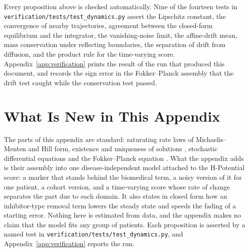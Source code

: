Every proposition above is checked automatically. Nine of the fourteen tests in
\texttt{verification/tests/test\_dynamics.py} assert the Lipschitz constant, the
convergence of nearby trajectories, agreement between the closed-form
equilibrium and the integrator, the vanishing-noise limit, the affine-drift
mean, mass conservation under reflecting boundaries, the separation of drift
from diffusion, and the product rule for the time-varying score.
Appendix~\ref{app:verification} prints the result of the run that produced this
document, and records the sign error in the Fokker--Planck assembly that the
drift test caught while the conservation test passed.


\section*{What Is New in This Appendix}

The parts of this appendix are standard: saturating rate laws of
Michaelis--Menten and Hill form, existence and uniqueness of solutions
\citep{coddington_levinson_1955,gronwall_1919}, stochastic differential
equations \citep{oksendal_2003} and the Fokker--Planck equation
\citep{risken_1996}. What the appendix adds is their assembly into one
disease-independent model attached to the H-Potential score: a marker that
stands behind the biomedical term, a noisy version of it for one patient, a
cohort version, and a time-varying score whose rate of change separates the
part due to each domain. It also states in closed form how an inhibitor-type
removal term lowers the steady state and speeds the fading of a starting error.
Nothing here is estimated from data, and the appendix makes no claim that the
model fits any group of patients. Each proposition is asserted by a named test
in \texttt{verification/tests/test\_dynamics.py}, and
Appendix~\ref{app:verification} reports the run.
